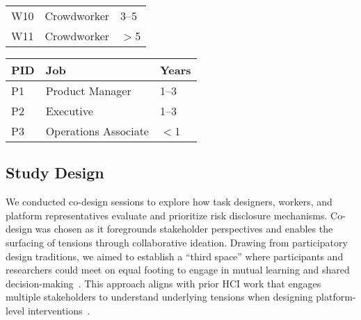\begin{table*}
\begin{minipage}[b]{0.32\textwidth}
\begin{tabular}{lll}
W10 & Crowdworker & 3--5 \\
W11 & Crowdworker & $>$5 \\
\bottomrule
\end{tabular}
\caption{Worker Participants}
\end{minipage}
\hfill
\begin{minipage}[b]{0.32\textwidth}
\centering
\begin{tabular}{lll}
\toprule
\textbf{PID} & \textbf{Job} & \textbf{Years} \\
\midrule
P1 & Product Manager & 1--3 \\
P2 & Executive & 1--3 \\
P3 & Operations Associate & $<$1 \\
\bottomrule
\end{tabular}
\caption{Platform Representatives}
\end{minipage}
\end{table*}











\subsection{Study Design}
We conducted co-design sessions to explore how task designers, workers, and platform representatives evaluate and prioritize risk disclosure mechanisms. Co-design was chosen as it foregrounds stakeholder perspectives and enables the surfacing of tensions through collaborative ideation. Drawing from participatory design traditions, we aimed to establish a ``third space'' where participants and researchers could meet on equal footing to engage in mutual learning and shared decision-making~\cite{muller_participatory_nodate, steen2013co, bodker_participatory_2018}. This approach aligns with prior HCI work that engages multiple stakeholders to understand underlying tensions when designing platform-level interventions~\cite{hsieh_designing_2023, tang2024ai}.

